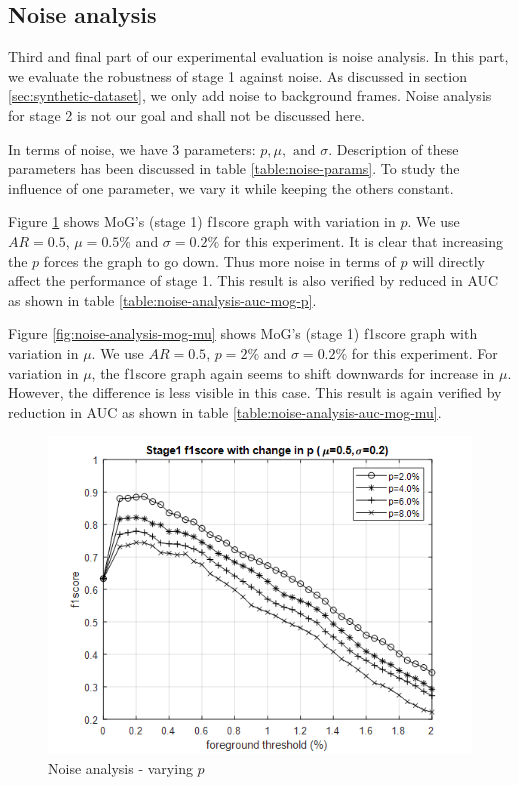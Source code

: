 \subsection{Noise analysis }
Third and final part of our experimental evaluation is noise analysis. In this part, we evaluate the robustness of stage 1 against noise. As discussed in section \ref{sec:synthetic-dataset}, we only add noise to background frames. Noise analysis for stage 2 is not our goal and shall not be discussed here. 

In terms of noise, we have 3 parameters: $p, \mu, \text{ and } \sigma$. Description of these parameters has been discussed in table \ref{table:noise-params}. To study the influence of one parameter, we vary it while keeping the others constant.   

Figure \ref{fig:noise-analysis-mog-p} shows MoG's (stage 1) f1score graph with variation in $p$. We use $AR=0.5$, $\mu=0.5\%$ and $\sigma=0.2\%$ for this experiment. It is clear that increasing the $p$ forces the graph to go down. Thus more noise in terms of $p$ will directly affect the performance of stage 1. This result is also verified by reduced in AUC as shown in table \ref{table:noise-analysis-auc-mog-p}.

Figure \ref{fig:noise-analysis-mog-mu} shows MoG's (stage 1) f1score graph with variation in $\mu$. We use $AR=0.5$, $p=2\%$ and $\sigma=0.2\%$ for this experiment. For variation in $\mu$, the f1score graph again seems to shift downwards for increase in $\mu$. However, the difference is less visible in this case. This result is again verified by reduction in AUC as shown in table \ref{table:noise-analysis-auc-mog-mu}.  

\begin{figure}
    \centering
    \includegraphics[width=\linewidth]{images/noise-analysis-mog-p.png}
    \caption{Noise analysis - varying $p$}
    \label{fig:noise-analysis-mog-p}
\end{figure}

